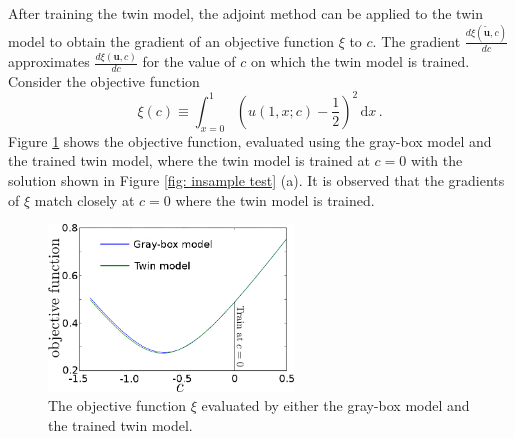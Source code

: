 
After training the twin model, the adjoint method can be applied to the twin model
to obtain the gradient of an objective function $\xi$ to 
$c$. The gradient 
$\frac{d\xi(\tilde{\boldsymbol{u}}, c)}{dc}$ approximates $\frac{d\xi(\boldsymbol{u}, c)}{dc}$
for the value of $c$ on which the twin model is trained.
Consider the objective function 
\begin{equation}
    \xi(c) \equiv \int_{x=0}^1 \left(u(1,x; c) - \frac{1}{2}\right)^2 \,\textrm{d}x\,.
    \label{eqn: objective ad hoc}
\end{equation}
Figure \ref{fig: objective ad hoc} shows the objective function, evaluated using 
the gray-box model and the trained twin model, where the twin model is trained
at $c=0$ with the solution shown in Figure \ref{fig: insample test} (a). 
It is observed that the gradients of $\xi$
match closely at $c=0$ where the twin model is trained.\\

\begin{figure}[htbp]\begin{center}
    \includegraphics[width=6.5cm]{../J_twin_vs_primal.png}
    \caption{The objective function $\xi$ evaluated by either the gray-box model
             and the trained twin model.}
    \label{fig: objective ad hoc}
\end{center}\end{figure}


